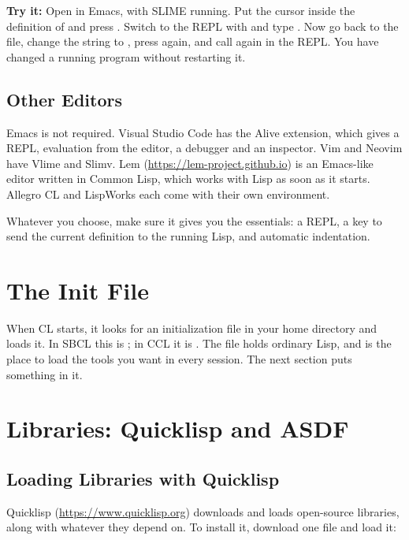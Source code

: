 \textbf{Try it:} Open  in Emacs, with SLIME
running. Put the cursor inside the definition of  and
press . Switch to the REPL with  and type
. Now go back to the file, change the string to
, press  again, and call
 again in the REPL. You have changed a running program
without restarting it.

\subsection{Other Editors}

Emacs is not required. Visual Studio Code has the Alive extension,
which gives a REPL, evaluation from the editor, a debugger and an
inspector. Vim and Neovim have Vlime and Slimv. Lem
(\url{https://lem-project.github.io}) is an Emacs-like editor written
in Common Lisp, which works with Lisp as soon as it starts. Allegro
CL and LispWorks each come with their own environment.

Whatever you choose, make sure it gives you the essentials: a REPL,
a key to send the current definition to the running Lisp, and
automatic indentation.

\section{The Init File}

When CL starts, it looks for an initialization file in your home
directory and loads it. In SBCL this is ; in CCL it is
. The file holds ordinary Lisp, and is the place
to load the tools you want in every session. The next section puts
something in it.

\section{Libraries: Quicklisp and ASDF}

\subsection{Loading Libraries with Quicklisp}

Quicklisp (\url{https://www.quicklisp.org}) downloads and loads
open-source libraries, along with whatever they depend on. To install
it, download one file and load it:

